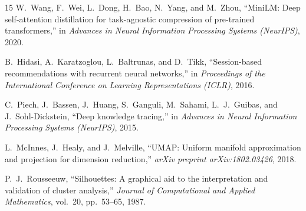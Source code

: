 \documentclass[conference]{IEEEtran}
\begin{document}
\begin{thebibliography}{15}
W.~Wang, F.~Wei, L.~Dong, H.~Bao, N.~Yang,
and M.~Zhou,
``MiniLM: Deep self-attention distillation for task-agnostic
compression of pre-trained transformers,''
in \textit{Advances in Neural Information Processing Systems
(NeurIPS)}, 2020.

B.~Hidasi, A.~Karatzoglou, L.~Baltrunas, and D.~Tikk,
``Session-based recommendations with recurrent neural
networks,''
in \textit{Proceedings of the International Conference on
Learning Representations (ICLR)}, 2016.

C.~Piech, J.~Bassen, J.~Huang, S.~Ganguli, M.~Sahami,
L.~J.~Guibas, and J.~Sohl-Dickstein,
``Deep knowledge tracing,''
in \textit{Advances in Neural Information Processing Systems
(NeurIPS)}, 2015.

L.~McInnes, J.~Healy, and J.~Melville,
``UMAP: Uniform manifold approximation and projection for
dimension reduction,''
\textit{arXiv preprint arXiv:1802.03426}, 2018.

P.~J.~Rousseeuw,
``Silhouettes: A graphical aid to the interpretation and
validation of cluster analysis,''
\textit{Journal of Computational and Applied Mathematics},
vol.~20, pp.~53--65, 1987.

\end{thebibliography}
\end{document}
